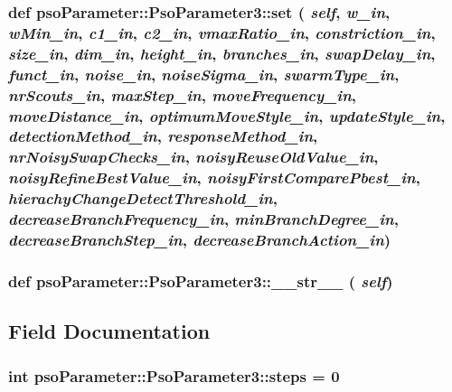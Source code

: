 \hypertarget{classpsoParameter_1_1PsoParameter3_c6c64ee3dd924e2e7733cb2f4d70492d}{
\subsubsection{\setlength{\rightskip}{0pt plus 5cm}def psoParameter::PsoParameter3::set ( {\em self}, \/   {\em w\_\-in}, \/   {\em wMin\_\-in}, \/   {\em c1\_\-in}, \/   {\em c2\_\-in}, \/   {\em vmaxRatio\_\-in}, \/   {\em constriction\_\-in}, \/   {\em size\_\-in}, \/   {\em dim\_\-in}, \/   {\em height\_\-in}, \/   {\em branches\_\-in}, \/   {\em swapDelay\_\-in}, \/   {\em funct\_\-in}, \/   {\em noise\_\-in}, \/   {\em noiseSigma\_\-in}, \/   {\em swarmType\_\-in}, \/   {\em nrScouts\_\-in}, \/   {\em maxStep\_\-in}, \/   {\em moveFrequency\_\-in}, \/   {\em moveDistance\_\-in}, \/   {\em optimumMoveStyle\_\-in}, \/   {\em updateStyle\_\-in}, \/   {\em detectionMethod\_\-in}, \/   {\em responseMethod\_\-in}, \/   {\em nrNoisySwapChecks\_\-in}, \/   {\em noisyReuseOldValue\_\-in}, \/   {\em noisyRefineBestValue\_\-in}, \/   {\em noisyFirstComparePbest\_\-in}, \/   {\em hierachyChangeDetectThreshold\_\-in}, \/   {\em decreaseBranchFrequency\_\-in}, \/   {\em minBranchDegree\_\-in}, \/   {\em decreaseBranchStep\_\-in}, \/   {\em decreaseBranchAction\_\-in})}}
\label{classpsoParameter_1_1PsoParameter3_c6c64ee3dd924e2e7733cb2f4d70492d}


\hypertarget{classpsoParameter_1_1PsoParameter3_b2d732e4d970cd2d1d187c2c3a6227f2}{
\subsubsection{\setlength{\rightskip}{0pt plus 5cm}def psoParameter::PsoParameter3::\_\-\_\-str\_\-\_\- ( {\em self})}}
\label{classpsoParameter_1_1PsoParameter3_b2d732e4d970cd2d1d187c2c3a6227f2}




\subsection{Field Documentation}
\hypertarget{classpsoParameter_1_1PsoParameter3_d2a441e49e2928f01b4af3ad64a85e1f}{
\subsubsection{\setlength{\rightskip}{0pt plus 5cm}int {\bf psoParameter::PsoParameter3::steps} = 0}}
\label{classpsoParameter_1_1PsoParameter3_d2a441e49e2928f01b4af3ad64a85e1f}


